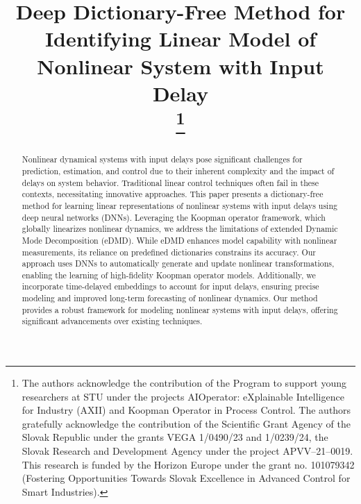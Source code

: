 \documentclass[conference]{IEEEtran}
\begin{document}
\title{Deep Dictionary-Free Method for Identifying Linear Model of Nonlinear System with Input Delay\\

    \thanks{The authors acknowledge the contribution of the Program to support young researchers at STU under the projects AIOperator: eXplainable Intelligence for Industry (AXII) and Koopman Operator in Process Control. The authors gratefully acknowledge the contribution of the Scientific Grant Agency of the Slovak Republic under the grants VEGA 1/0490/23 and 1/0239/24, the Slovak Research and Development Agency under the project APVV--21--0019. This research is funded by the Horizon Europe under the grant no. 101079342 (Fostering Opportunities Towards Slovak Excellence in Advanced Control for Smart Industries).}
}

\author{
}

\maketitle

\begin{abstract}
    Nonlinear dynamical systems with input delays pose significant challenges for prediction, estimation, and control due to their inherent complexity and the impact of delays on system behavior. Traditional linear control techniques often fail in these contexts, necessitating innovative approaches. This paper presents a dictionary-free method for learning linear representations of nonlinear systems with input delays using deep neural networks (DNNs). Leveraging the Koopman operator framework, which globally linearizes nonlinear dynamics, we address the limitations of extended Dynamic Mode Decomposition (eDMD). While eDMD enhances model capability with nonlinear measurements, its reliance on predefined dictionaries constrains its accuracy. Our approach uses DNNs to automatically generate and update nonlinear transformations, enabling the learning of high-fidelity Koopman operator models. Additionally, we incorporate time-delayed embeddings to account for input delays, ensuring precise modeling and improved long-term forecasting of nonlinear dynamics. Our method provides a robust framework for modeling nonlinear systems with input delays, offering significant advancements over existing techniques.
\end{abstract}
\end{document}
